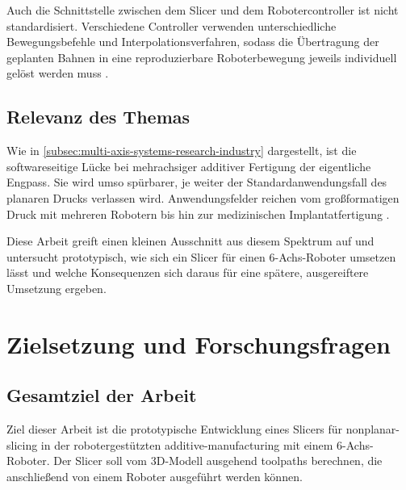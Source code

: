             Auch die Schnittstelle zwischen dem Slicer und dem Robotercontroller ist nicht standardisiert.
            Verschiedene Controller verwenden unterschiedliche Bewegungsbefehle und Interpolationsverfahren, sodass die Übertragung der geplanten Bahnen in eine reproduzierbare Roboterbewegung jeweils individuell gelöst werden muss \autocite[vgl.][S.~336--342]{urhalRobotAssistedAdditive2019}.

        \subsection{Relevanz des Themas}\label{subsec:scientific-relevance-of-research-project}
            Wie in \cref{subsec:multi-axis-systems-research-industry} dargestellt, ist die softwareseitige Lücke bei mehrachsiger additiver Fertigung der eigentliche Engpass.
            Sie wird umso spürbarer, je weiter der Standardanwendungsfall des planaren Drucks verlassen wird.
            Anwendungsfelder reichen vom großformatigen Druck mit mehreren Robotern \autocite[vgl.][S.~1--4]{shenResearchLargescaleAdditive2019} bis hin zur medizinischen Implantatfertigung \autocite[vgl.][S.~951--960]{martin-rodriguezRoboticPlatformNavigated2025}.

            Diese Arbeit greift einen kleinen Ausschnitt aus diesem Spektrum auf und untersucht prototypisch, wie sich ein Slicer für einen 6-Achs-Roboter umsetzen lässt und welche Konsequenzen sich daraus für eine spätere, ausgereiftere Umsetzung ergeben.

    \section{Zielsetzung und Forschungsfragen}\label{sec:objectives-and-research-questions}
        \subsection{Gesamtziel der Arbeit}\label{subsec:overall-objective}
            Ziel dieser Arbeit ist die prototypische Entwicklung eines Slicers für \gls{nonplanar-slicing} in der robotergestützten \gls{additive-manufacturing} mit einem 6-Achs-Roboter.
            Der Slicer soll vom 3D-Modell ausgehend \glspl{toolpath} berechnen, die anschließend von einem Roboter ausgeführt werden können.

